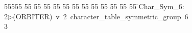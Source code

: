 %
%
\begin{tabbing}
55555 \= 55 \= 55 \= 55 \= 55 \= 55 \= 55 \= 55 \= 55 \= 55 \= 55 \= 55 \= 55 \= \>Char\_Sym\_6:\\[0pt]
2\>$\triangleright$\>(ORBITER)\ v\ 2\ character\_table\_symmetric\_group\ 6\\[0pt]
3\>\end{tabbing}
